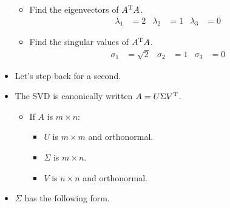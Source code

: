 \documentclass{article}
\begin{document}
\begin{itemize}
\begin{itemize}
\begin{equation*}
        \end{equation*}
        \item Find the eigenvectors of $A^{\text{T}} A$.
        \begin{align*}
            \lambda_1 &= 2&
            \lambda_2 &= 1&
            \lambda_3 &= 0
        \end{align*}
        \item Find the singular values of $A^{\text{T}} A$.
        \begin{align*}
            \sigma_1 &= \sqrt{2}&
            \sigma_2 &= 1&
            \sigma_3 &= 0
        \end{align*}
    \end{itemize}


    \item {}Let's step back for a second.
    \item The SVD is canonically written $A=U\Sigma V^{\text{T}}$.
    \begin{itemize}
        \item If $A$ is $m\times n$:
        \begin{itemize}
            \item $U$ is $m\times m$ and orthonormal.
            \item $\Sigma$ is $m\times n$.
            \item $V$ is $n\times n$ and orthonormal.
        \end{itemize}
    \end{itemize}
    \item $\Sigma$ has the following form.
    \begin{center}
\end{center}
\end{itemize}
\end{document}
